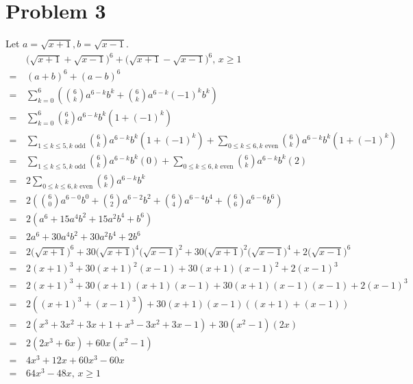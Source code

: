 \documentclass{article}
\begin{document}
\section*{Problem 3}
Let $a=\sqrt{x+1},b=\sqrt{x-1}$.
\begin{align*}
	&\bigl(\sqrt{x+1}+\sqrt{x-1}\bigr)^6+
		\bigl(\sqrt{x+1}-\sqrt{x-1}\bigr)^6,\,x\geq1 \\
	=\,&(a+b)^6+(a-b)^6 \\
	=\,&\sum_{k=0}^{6}\left(\binom{6}{k}a^{6-k}b^k+
		\binom{6}{k}a^{6-k}(-1)^kb^k\right) \\
	=\,&\sum_{k=0}^{6}\binom{6}{k}a^{6-k}b^k\left(1+(-1)^k\right) \\
	=\,&\sum_{1\leq k\leq5,k\text{ odd}}\binom{6}{k}a^{6-k}b^k\left(
		1+(-1)^k\right)+\sum_{0\leq k\leq6,k\text{ even}}
		\binom{6}{k}a^{6-k}b^k\left(1+(-1)^k\right) \\
		=\,&\sum_{1\leq k\leq5,k\text{ odd}}\binom{6}{k}a^{6-k}b^k(0)+
		\sum_{0\leq k\leq6,k\text{ even}}\binom{6}{k}a^{6-k}b^k(2) \\
	=\,&2\sum_{0\leq k\leq6,k\text{ even}}\binom{6}{k}a^{6-k}b^k \\
	=\,&2\left(\binom{6}{0}a^{6-0}b^0+\binom{6}{2}a^{6-2}b^2+
		\binom{6}{4}a^{6-4}b^4+\binom{6}{6}a^{6-6}b^6\right) \\
	=\,&2\left(a^6+15a^4b^2+15a^2b^4+b^6\right) \\
	=\,&2a^6+30a^4b^2+30a^2b^4+2b^6 \\
	=\,&2\bigl(\sqrt{x+1}\bigr)^6+30\bigl(\sqrt{x+1}\bigr)^4
		\bigl(\sqrt{x-1}\bigr)^2+30\bigl(\sqrt{x+1}\bigr)^2
		\bigl(\sqrt{x-1}\bigr)^4+2\bigl(\sqrt{x-1}\bigr)^6 \\
	=\,&2(x+1)^3+30(x+1)^2(x-1)+30(x+1)(x-1)^2+2(x-1)^3 \\
	=\,&2(x+1)^3+30(x+1)(x+1)(x-1)+30(x+1)(x-1)(x-1)+2(x-1)^3 \\
	=\,&2\left((x+1)^3+(x-1)^3\right)+30(x+1)(x-1)((x+1)+(x-1)) \\
	=\,&2\left(x^3+3x^2+3x+1+x^3-3x^2+3x-1\right)+30(x^2-1)(2x) \\
	=\,&2\left(2x^3+6x\right)+60x(x^2-1) \\
	=\,&4x^3+12x+60x^3-60x \\
	=\,&\boxed{64x^3-48x,\,x\geq1}
\end{align*}

\pagebreak
\end{document}
